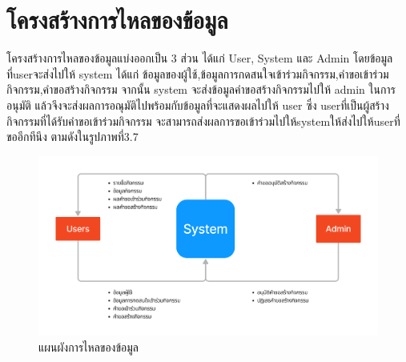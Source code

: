 \section{โครงสร้างการไหลของข้อมูล}
โครงสร้างการไหลของข้อมูลแบ่งออกเป็น 3 ส่วน ได้แก่ User, System และ Admin
โดยข้อมูลที่userจะส่งไปให้ system ได้แก่ ข้อมูลของผู้ใช้,ข้อมูลการกดสนใจเข้าร่วมกิจกรรม,คำขอเข้าร่วมกิจกรรม,คำขอสร้างกิจกรรม
จากนั้น system จะส่งข้อมูลคำขอสร้างกิจกรรมไปให้ admin ในการอนุมัติ แล้วจึงจะส่งผลการอณุมัติไปพร้อมกับข้อมูลที่จะแสดงผลไปให้ user
ซึ่ง userที่เป็นผู้สร้างกิจกรรมที่ได้รับคำขอเข้าร่วมกิจกรรม จะสามารถส่งผลการขอเข้าร่วมไปให้systemให้ส่งไปให้userที่ขออีกทีนึง ตามดังในรูปภาพที่3.7
\begin{figure}[h]
\begin{center}
\includegraphics[width=0.9\linewidth]{image/dataflow-diagram.png}
\end{center}
\caption[Poem]{แผนผังการไหลของข้อมูล}
\label{fig:dataflow}
\end{figure}


